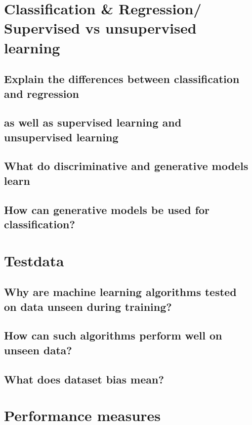 \section{Classification \& Regression/ Supervised vs unsupervised learning}

\subsection{Explain the differences between classification and regression }

\subsection{as well as supervised learning and unsupervised learning }

\subsection{What do discriminative and generative models learn }

\subsection{How can generative models be used for classification?}

\section{Testdata}

\subsection{Why are machine learning algorithms tested on data unseen during training?}

\subsection{How can such algorithms perform well on unseen data?}

\subsection{What does dataset bias mean? }

\section{Performance measures}

